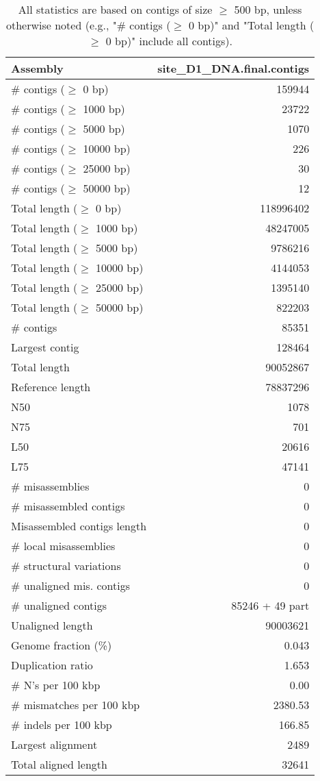 \documentclass[12pt,a4paper]{article}
\begin{document}
\begin{table}[ht]
\begin{center}
\caption{All statistics are based on contigs of size $\geq$ 500 bp, unless otherwise noted (e.g., "\# contigs ($\geq$ 0 bp)" and "Total length ($\geq$ 0 bp)" include all contigs).}
\begin{tabular}{|l*{1}{|r}|}
\hline
Assembly & site\_D1\_DNA.final.contigs \\ \hline
\# contigs ($\geq$ 0 bp) & 159944 \\ \hline
\# contigs ($\geq$ 1000 bp) & 23722 \\ \hline
\# contigs ($\geq$ 5000 bp) & 1070 \\ \hline
\# contigs ($\geq$ 10000 bp) & 226 \\ \hline
\# contigs ($\geq$ 25000 bp) & 30 \\ \hline
\# contigs ($\geq$ 50000 bp) & 12 \\ \hline
Total length ($\geq$ 0 bp) & 118996402 \\ \hline
Total length ($\geq$ 1000 bp) & 48247005 \\ \hline
Total length ($\geq$ 5000 bp) & 9786216 \\ \hline
Total length ($\geq$ 10000 bp) & 4144053 \\ \hline
Total length ($\geq$ 25000 bp) & 1395140 \\ \hline
Total length ($\geq$ 50000 bp) & 822203 \\ \hline
\# contigs & 85351 \\ \hline
Largest contig & 128464 \\ \hline
Total length & 90052867 \\ \hline
Reference length & 78837296 \\ \hline
N50 & 1078 \\ \hline
N75 & 701 \\ \hline
L50 & 20616 \\ \hline
L75 & 47141 \\ \hline
\# misassemblies & 0 \\ \hline
\# misassembled contigs & 0 \\ \hline
Misassembled contigs length & 0 \\ \hline
\# local misassemblies & 0 \\ \hline
\# structural variations & 0 \\ \hline
\# unaligned mis. contigs & 0 \\ \hline
\# unaligned contigs & 85246 + 49 part \\ \hline
Unaligned length & 90003621 \\ \hline
Genome fraction (\%) & 0.043 \\ \hline
Duplication ratio & 1.653 \\ \hline
\# N's per 100 kbp & 0.00 \\ \hline
\# mismatches per 100 kbp & 2380.53 \\ \hline
\# indels per 100 kbp & 166.85 \\ \hline
Largest alignment & 2489 \\ \hline
Total aligned length & 32641 \\ \hline
\end{tabular}
\end{center}
\end{table}
\end{document}
